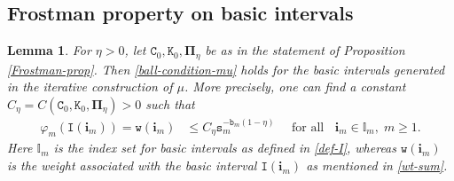 \documentclass[12pt, twoside]{article}
\newtheorem{lemma}[theorem]{Lemma}
\theoremstyle{definition}
\numberwithin{equation}{section}
\begin{document}
\subsection{Frostman property on basic intervals} \label{Frostman-basic-section}  
\begin{lemma} \label{Frostman-lemma} 
	For $\eta > 0$, let $\mathtt C_0, \mathtt K_0, \pmb{\Pi}_{\eta}$ be as in the statement of Proposition \ref{Frostman-prop}. Then \eqref{ball-condition-mu} holds for the basic intervals generated in the iterative construction of $\mu$. More precisely, one can find a constant $C_{\eta} = C(\mathtt C_0, \mathtt K_0, \pmb{\Pi}_{\eta}) > 0$ such that  
	\begin{align} \label{ball-condition} 
		\varphi_m(\mathtt I(\mathbf i_m)) = \mathtt w(\mathbf i_m) &\leq C_{\eta} \mathtt s_m^{-\mathtt b_m(1 - \eta)} \quad \text{ for all  } \; \; \mathbf i_m \in \mathbb I_m, \; m \geq 1.   
	\end{align} 
	Here $\mathbb I_m$ is the index set for basic intervals as defined in \eqref{def-I}, whereas $\mathtt w(\mathbf i_m)$ is the weight associated with the  basic interval $\mathtt I(\mathbf i_m)$ as mentioned in \eqref{wt-sum}. 
\end{lemma} 
\end{document}
